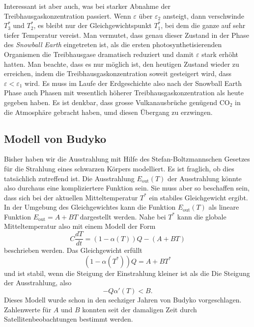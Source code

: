 Interessant ist aber auch, was bei starker Abnahme der
Treibhausgaskonzentration passiert.
Wenn $\varepsilon$ über $\varepsilon_2$ ansteigt, dann verschwinde
$T_3^*$ und $T_2^*$, es bleibt nur der Gleichgewichtspunkt $T_1^*$,
bei dem die ganze auf sehr tiefer Temperatur vereist.
Man vermutet, dass genau dieser Zustand in der Phase des {\em Snowball Earth}
eingetreten ist, als die ersten photosynthetisierenden Organismen die
Treibhausgase dramatisch reduziert und damit $\varepsilon$ stark
erhöht hatten.
Man beachte, dass es nur möglich ist, den heutigen Zustand wieder zu 
erreichen, indem die Treibhausgaskonzentration soweit gesteigert
wird, dass $\varepsilon<\varepsilon_1$ wird.
Es muss im Laufe der Erdgeschichte also nach der Snowball Earth Phase
auch Phasen mit wesentlich höherer Treibhausgaskonzentration als heute
gegeben haben.
Es ist denkbar, dass grosse Vulkanausbrüche genügend $\text{CO}_2$ in die
Atmosphäre gebracht haben, umd diesen Übergang zu erzwingen.

\subsection{Modell von Budyko\label{subsection:modell von budyko}}
Bisher haben wir die Ausstrahlung mit Hilfe des Stefan-Boltzmannschen
Gesetzes für die Strahlung eines schwarzen Körpers modelliert.
Es ist fraglich, ob dies tatsächlich zutreffend ist.
Die Ausstrahlung $E_\text{out}(T)$ der Ausstrahlung könnte also durchaus
eine kompliziertere Funktion sein.
Sie muss aber so beschaffen sein, dass sich bei der aktuellen
Mitteltemperatur $T^*$ ein stabiles Gleichgewicht ergibt.
In der Umgebung des Gleichgewichtes kann die Funktion $E_\text{out}(T)$
als lineare Funktion
$E_\text{out}= A+BT$
dargestellt werden.
Nahe bei $T^*$ kann die globale Mitteltemperatur also mit einem Modell
der Form
\begin{equation}
C
\frac{dT}{dt}
=
(1-\alpha(T)) Q- (A+BT)
\end{equation}
beschrieben werden.
Das Gleichgewicht erfüllt
\[
(1-\alpha(T^*))Q=A+BT^*
\] 
und ist stabil, wenn die Steigung der Einstrahlung kleiner ist als die
Die Steigung der Ausstrahlung, also
\begin{equation}
-Q\alpha'(T)
<
B.
\label{skript:budyko:cond}
\end{equation}
Dieses Modell wurde schon in den sechziger Jahren von Budyko vorgeschlagen.
Zahlenwerte für $A$ und $B$ konnten seit der damaligen Zeit durch
Satellitenbeobachtungen bestimmt werden.

